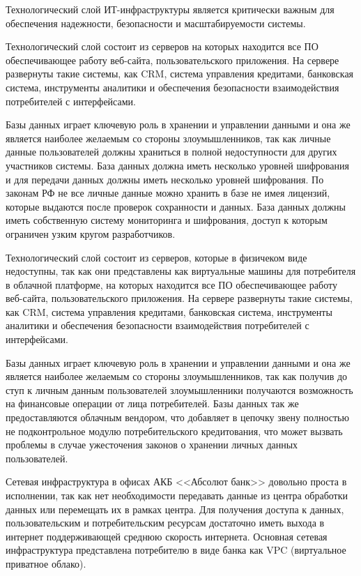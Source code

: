 \documentclass[14pt, a4paper]{extarticle}
\begin{document}
Технологический слой ИТ-инфраструктуры является критически важным для
обеспечения надежности, безопасности и масштабируемости системы.

Технологический слой состоит из серверов на которых находится все ПО
обеспечивающее работу веб-сайта, пользовательского приложения. На сервере
развернуты такие системы, как CRM, система управления кредитами, банковская
система, инструменты аналитики и обеспечения безопасности взаимодействия
потребителей с интерфейсами.

Базы данных играет ключевую роль в хранении и управлении данными и она же
является наиболее желаемым со стороны злоумышленников, так как личные данные
пользователей должны храниться в полной недоступности для других участников
системы. База данных должна иметь несколько уровней шифрования и для передачи
данных должны иметь несколько уровней шифрования. По законам РФ не все личные
данные можно хранить в базе не имея лицензий, которые выдаются после проверок
сохранности и данных. База данных должны иметь собственную систему мониторинга
и шифрования, доступ к которым ограничен узким кругом разработчиков.

Технологический слой состоит из серверов, которые в физичеком виде
недоступны, так как они представлены как виртуальные машины для потребителя в
облачной платформе, на которых находится все ПО обеспечивающее работу
веб-сайта, пользовательского приложения. На сервере развернуты такие системы,
как CRM, система управления кредитами, банковская система, инструменты
аналитики и обеспечения безопасности взаимодействия потребителей с
интерфейсами.

Базы данных играет ключевую роль в хранении и управлении данными и она же
является наиболее желаемым со стороны злоумышленников, так как получив до
ступ к личным данным пользователей злоумышленники получаются возможность на
финансовые операции от лица потребителей. Базы данных так же предоставляются
облачным вендором, что добавляет в цепочку звену полностью не подконтрольное
модулю потребительского кредитования, что может вызвать проблемы в случае
ужесточения законов о хранении личных данных пользователей.

Сетевая инфраструктура в офисах АКБ <<Абсолют банк>> довольно проста в
исполнении, так как нет необходимости передавать данные из центра обработки
данных или перемещать их в рамках центра. Для получения доступа к
данных, пользовательским и потребительским ресурсам достаточно иметь выхода в
интернет поддерживающей среднюю скорость интернета. Основная сетевая
инфраструктура представлена потребителю в виде банка как VPC (виртуальное
приватное облако).
\end{document}
